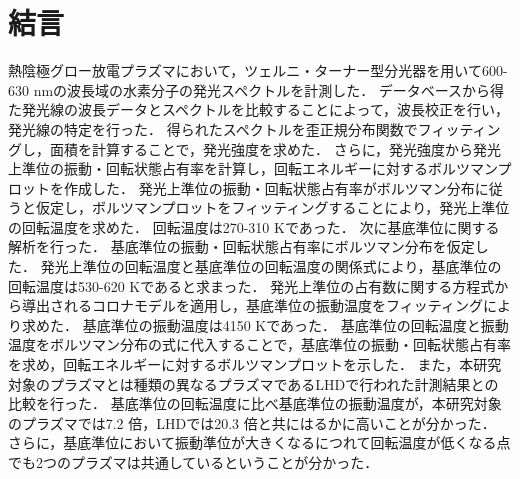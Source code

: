 \chapter{結言}

熱陰極グロー放電プラズマにおいて，ツェルニ・ターナー型分光器を用いて600-630 nmの波長域の水素分子の発光スペクトルを計測した．
データベースから得た発光線の波長データとスペクトルを比較することによって，波長校正を行い，発光線の特定を行った．
得られたスペクトルを歪正規分布関数でフィッティングし，面積を計算することで，発光強度を求めた．
さらに，発光強度から発光上準位の振動・回転状態占有率を計算し，回転エネルギーに対するボルツマンプロットを作成した．
発光上準位の振動・回転状態占有率がボルツマン分布に従うと仮定し，ボルツマンプロットをフィッティングすることにより，発光上準位の回転温度を求めた．
回転温度は270-310 Kであった．
次に基底準位に関する解析を行った．
基底準位の振動・回転状態占有率にボルツマン分布を仮定した．
発光上準位の回転温度と基底準位の回転温度の関係式により，基底準位の回転温度は530-620 Kであると求まった．
発光上準位の占有数に関する方程式から導出されるコロナモデルを適用し，基底準位の振動温度をフィッティングにより求めた．
基底準位の振動温度は4150 Kであった．
基底準位の回転温度と振動温度をボルツマン分布の式に代入することで，基底準位の振動・回転状態占有率を求め，回転エネルギーに対するボルツマンプロットを示した．
また，本研究対象のプラズマとは種類の異なるプラズマであるLHDで行われた計測結果との比較を行った．
基底準位の回転温度に比べ基底準位の振動温度が，本研究対象のプラズマでは7.2 倍，LHDでは20.3 倍と共にはるかに高いことが分かった．
さらに，基底準位において振動準位が大きくなるにつれて回転温度が低くなる点でも2つのプラズマは共通しているということが分かった．
